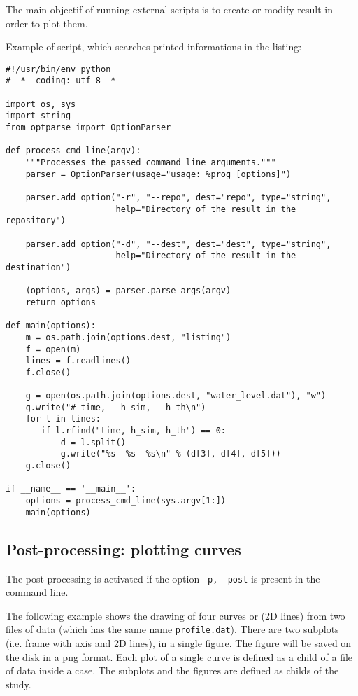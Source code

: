 \documentclass[a4paper,10pt,twoside]{article}
\begin{document}
The main objectif of running external scripts is to create or modify
result in order to plot them.

Example of script, which searches printed informations in the listing:
\begin{verbatim}
#!/usr/bin/env python
# -*- coding: utf-8 -*-

import os, sys
import string
from optparse import OptionParser

def process_cmd_line(argv):
    """Processes the passed command line arguments."""
    parser = OptionParser(usage="usage: %prog [options]")

    parser.add_option("-r", "--repo", dest="repo", type="string",
                      help="Directory of the result in the repository")

    parser.add_option("-d", "--dest", dest="dest", type="string",
                      help="Directory of the result in the destination")

    (options, args) = parser.parse_args(argv)
    return options

def main(options):
    m = os.path.join(options.dest, "listing")
    f = open(m)
    lines = f.readlines()
    f.close()

    g = open(os.path.join(options.dest, "water_level.dat"), "w")
    g.write("# time,   h_sim,   h_th\n")
    for l in lines:
       if l.rfind("time, h_sim, h_th") == 0:
           d = l.split()
           g.write("%s  %s  %s\n" % (d[3], d[4], d[5]))
    g.close()

if __name__ == '__main__':
    options = process_cmd_line(sys.argv[1:])
    main(options)
\end{verbatim}

\subsection{Post-processing: plotting curves}

The post-processing is activated if the option \texttt{-p, --post} is present in the command line.

The following example shows the drawing of four curves or (2D lines) from two files of data (which
has the same name \texttt{profile.dat}). There are two subplots (i.e. frame with axis and 2D lines),
in a single figure. The figure will be saved on the disk in a png format.
Each plot of a single curve is defined as a child of a file of data inside a case. The subplots and 
the figures are defined as childs of the study.
\end{document}
